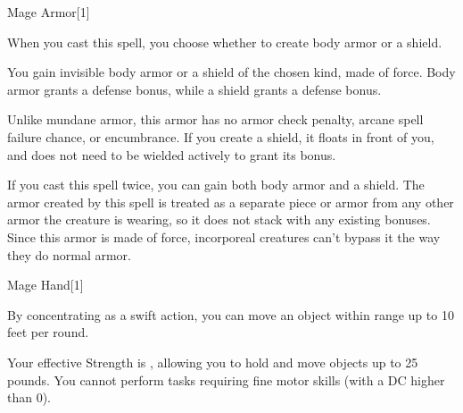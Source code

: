 \begin{spellsection}{Mage Armor}[1]
    \begin{spellheader}
    \end{spellheader}
    \begin{spellcontent}
        \begin{spelltargetinginfo}
            \spellspecial When you cast this spell, you choose whether to create body armor or a shield.
        \end{spelltargetinginfo}
        \begin{spelleffects}
            \spelleffect You gain invisible body armor or a shield of the chosen kind, made of force. Body armor grants a  defense bonus, while a shield grants a  defense bonus.
            \par Unlike mundane armor, this armor has no armor check penalty, arcane spell failure chance, or encumbrance. If you create a shield, it floats in front of you, and does not need to be wielded actively to grant its bonus.
            \spelldur \durlong
        \end{spelleffects}
    \end{spellcontent}
    \begin{spellfooter}
        \spellnotes If you cast this spell twice, you can gain both body armor and a shield. The armor created by this spell is treated as a separate piece or armor from any other armor the creature is wearing, so it does not stack with any existing bonuses. Since this armor is made of force, incorporeal creatures can't bypass it the way they do normal armor.
        \miscastexplode
    \end{spellfooter}
\end{spellsection}

\begin{spellsection}{Mage Hand}[1]
    \begin{spellheader}
    \end{spellheader}
    \begin{spellcontent}
        \begin{spelltargetinginfo}
            \spellrng{\rngclose}
        \end{spelltargetinginfo}
        \begin{spelleffects}
            \spelleffect By concentrating as a swift action, you can move an object within range up to 10 feet per round.

            Your effective Strength is , allowing you to hold and move objects up to 25 pounds. You cannot perform tasks requiring fine motor skills (with a DC higher than 0).
            \spelldur \durshort
        \end{spelleffects}
    \end{spellcontent}
    \begin{spellfooter}
        \miscastexplode
    \end{spellfooter}
\end{spellsection}

